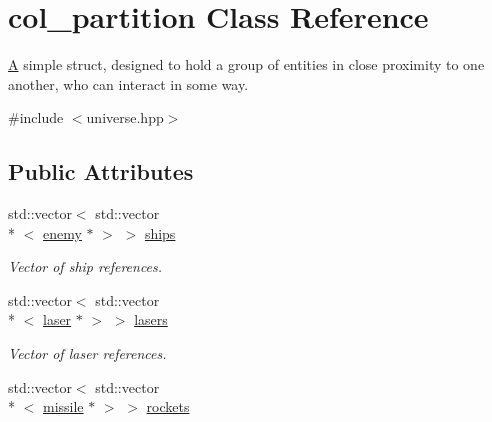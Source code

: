 \hypertarget{structcol__partition}{\section{col\-\_\-partition Class Reference}
\label{structcol__partition}
}


\hyperlink{struct_a}{A} simple struct, designed to hold a group of entities in close proximity to one another, who can interact in some way.  




{\ttfamily \#include $<$universe.\-hpp$>$}

\subsection*{Public Attributes}
\begin{DoxyCompactItemize}
\item 
\hypertarget{structcol__partition_ab69905db296ca37408dbe6f1ab011a26}{std\-::vector$<$ std\-::vector\\*
$<$ \hyperlink{classenemy}{enemy} $\ast$ $>$ $>$ \hyperlink{structcol__partition_ab69905db296ca37408dbe6f1ab011a26}{ships}}\label{structcol__partition_ab69905db296ca37408dbe6f1ab011a26}

\begin{DoxyCompactList}\small\item\em Vector of ship references. \end{DoxyCompactList}\item 
\hypertarget{structcol__partition_a0afda4d9265e546a9d7a99688ed86106}{std\-::vector$<$ std\-::vector\\*
$<$ \hyperlink{classlaser}{laser} $\ast$ $>$ $>$ \hyperlink{structcol__partition_a0afda4d9265e546a9d7a99688ed86106}{lasers}}\label{structcol__partition_a0afda4d9265e546a9d7a99688ed86106}

\begin{DoxyCompactList}\small\item\em Vector of laser references. \end{DoxyCompactList}\item 
\hypertarget{structcol__partition_a254fbb79574d28efe247fb4fcd57b049}{std\-::vector$<$ std\-::vector\\*
$<$ \hyperlink{classmissile}{missile} $\ast$ $>$ $>$ \hyperlink{structcol__partition_a254fbb79574d28efe247fb4fcd57b049}{rockets}}\label{structcol__partition_a254fbb79574d28efe247fb4fcd57b049}


\end{DoxyCompactItemize}
